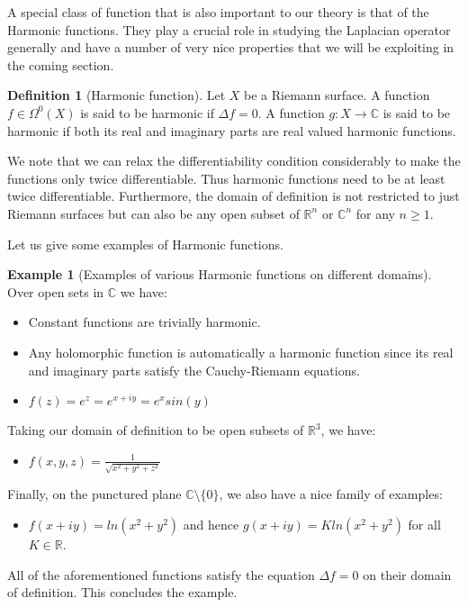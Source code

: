 \documentclass[a4paper,12pt]{report}
\theoremstyle{plain}
\theoremstyle{definition}
\newtheorem{defn}[thm]{Definition}
\newtheorem{example}[thm]{Example}
\begin{document}
A special class of function that is also important to our theory is that of the 
Harmonic functions. They play a crucial role in studying the Laplacian operator generally and have a number of very nice properties that we will be exploiting in the coming section.
\begin{defn}[Harmonic function]\label{HarmonicDef}
  Let $X$ be a Riemann surface. A function $f\in \Omega^0(X)$ is said to be harmonic if $\Delta f = 0$. A  function $g:X \rightarrow \mathbb{C}$ is said to be harmonic if both its real and imaginary parts are real valued harmonic functions.
\end{defn}
We note that we can relax the differentiability condition considerably to make the functions only twice differentiable. Thus harmonic functions need to be at least twice differentiable. Furthermore, the domain of definition is not restricted to just Riemann surfaces but can also be any open subset of $\mathbb{R}^n$ or $\mathbb{C}^n$ for any $n\geq 1$. 

Let us give some examples of Harmonic functions.
\newpage

\begin{example}[Examples of various Harmonic functions on different domains]
  Over open sets in $\mathbb{C}$ we have:
  \begin{itemize} 
    \item Constant functions are trivially harmonic.
    \item Any holomorphic function is automatically a harmonic function since its real and imaginary parts satisfy the Cauchy-Riemann equations.
    \item $f(z)=e^z=e^{x+iy}=e^xsin(y)$
  \end{itemize}
  Taking our domain of definition to be open subsets of $\mathbb{R}^3$, we have:
  \begin{itemize} 
    \item $f(x,y,z)=\frac{1}{\sqrt{x^2+y^2+z^2}}$
  \end{itemize}
  Finally, on the punctured plane $\mathbb{C}\setminus \{0\}$, we also have a nice family of examples:
  \begin{itemize}
    \item $f(x+iy) = ln(x^2 + y^2)$ and hence $g(x+iy)=K ln(x^2+y^2)$ for all $K \in \mathbb{R}$.
  \end{itemize}
  All of the aforementioned functions satisfy the equation $\Delta f = 0$ on their domain of definition. This concludes the example.
\end{example}
\end{document}
